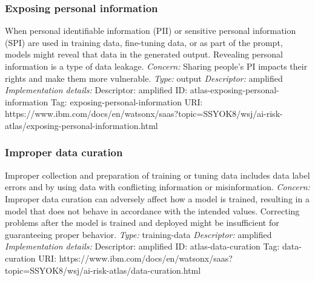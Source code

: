 \documentclass{article}
\begin{document}
\subsubsection*{Exposing personal information}
When personal identifiable information (PII) or sensitive personal information (SPI) are used in training data, fine-tuning data, or as part of the prompt, models might reveal that data in the generated output. Revealing personal information is a type of data leakage.\newline
\textit{Concern: }Sharing people's PI impacts their rights and make them more vulnerable.\newline\newline
\textit{Type: }output\newline
\textit{Descriptor: }amplified \newline\newline
\textit{Implementation details:} \newline
Descriptor: amplified \newline
ID: atlas-exposing-personal-information \newline
Tag: exposing-personal-information \newline
URI:  https://www.ibm.com/docs/en/watsonx/saas?topic=SSYOK8/wsj/ai-risk-atlas/exposing-personal-information.html\newline
\subsubsection*{Improper data curation}
Improper collection and preparation of training or tuning data includes data label errors and by using data with conflicting information or misinformation.\newline
\textit{Concern: }Improper data curation can adversely affect how a model is trained, resulting in a model that does not behave in accordance with the intended values. Correcting problems after the model is trained and deployed might be insufficient for guaranteeing proper behavior. \newline\newline
\textit{Type: }training-data\newline
\textit{Descriptor: }amplified \newline\newline
\textit{Implementation details:} \newline
Descriptor: amplified \newline
ID: atlas-data-curation \newline
Tag: data-curation \newline
URI:  https://www.ibm.com/docs/en/watsonx/saas?topic=SSYOK8/wsj/ai-risk-atlas/data-curation.html\newline
\end{document}
